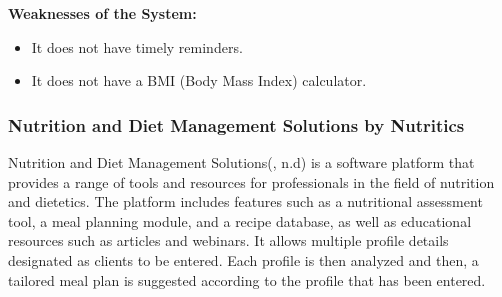 \documentclass{article}
\begin{document}
\textbf{Weaknesses of the System:}
\begin{itemize}
\item It does not have timely reminders.
\item It does not have a BMI (Body Mass Index) calculator.
\end{itemize}

\subsubsection{Nutrition and Diet Management Solutions by Nutritics}

Nutrition and Diet Management Solutions(, n.d) is a software platform that provides a range of tools and resources for professionals in the field of nutrition and dietetics. The platform includes features such as a nutritional assessment tool, a meal planning module, and a recipe database, as well as educational resources such as articles and webinars. It allows multiple profile details designated as clients to be entered. Each profile is then analyzed and then, a tailored meal plan is suggested according to the profile that has been entered.
\end{document}
